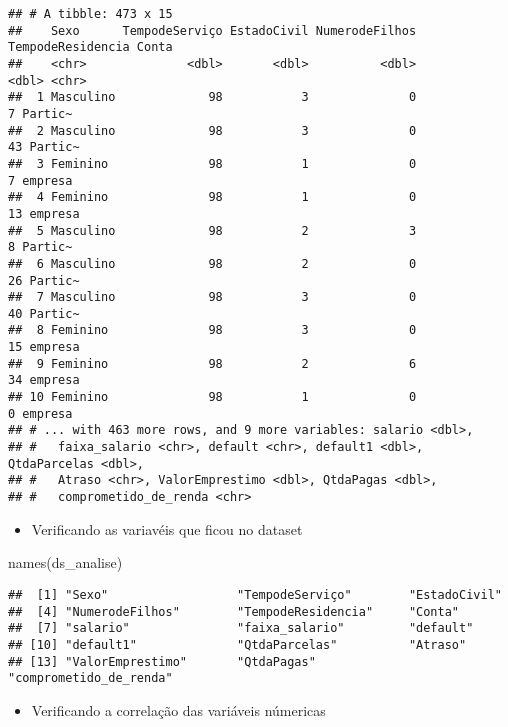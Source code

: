 \documentclass[
]{article}
\newenvironment{Shaded}{\begin{snugshade}}{\end{snugshade}}
\newcommand{\FunctionTok}[1]{\textcolor[rgb]{0.00,0.00,0.00}{#1}}
\newcommand{\NormalTok}[1]{#1}
\providecommand{\tightlist}{%
  \setlength{\itemsep}{0pt}\setlength{\parskip}{0pt}}
\begin{document}
\begin{verbatim}
## # A tibble: 473 x 15
##    Sexo      TempodeServiço EstadoCivil NumerodeFilhos TempodeResidencia Conta  
##    <chr>              <dbl>       <dbl>          <dbl>             <dbl> <chr>  
##  1 Masculino             98           3              0                 7 Partic~
##  2 Masculino             98           3              0                43 Partic~
##  3 Feminino              98           1              0                 7 empresa
##  4 Feminino              98           1              0                13 empresa
##  5 Masculino             98           2              3                 8 Partic~
##  6 Masculino             98           2              0                26 Partic~
##  7 Masculino             98           3              0                40 Partic~
##  8 Feminino              98           3              0                15 empresa
##  9 Feminino              98           2              6                34 empresa
## 10 Feminino              98           1              0                 0 empresa
## # ... with 463 more rows, and 9 more variables: salario <dbl>,
## #   faixa_salario <chr>, default <chr>, default1 <dbl>, QtdaParcelas <dbl>,
## #   Atraso <chr>, ValorEmprestimo <dbl>, QtdaPagas <dbl>,
## #   comprometido_de_renda <chr>
\end{verbatim}

\begin{itemize}
\tightlist
\item
  Verificando as variavéis que ficou no dataset
\end{itemize}

\begin{Shaded}
\begin{Highlighting}[]
\FunctionTok{names}\NormalTok{(ds\_analise)}
\end{Highlighting}
\end{Shaded}

\begin{verbatim}
##  [1] "Sexo"                  "TempodeServiço"        "EstadoCivil"          
##  [4] "NumerodeFilhos"        "TempodeResidencia"     "Conta"                
##  [7] "salario"               "faixa_salario"         "default"              
## [10] "default1"              "QtdaParcelas"          "Atraso"               
## [13] "ValorEmprestimo"       "QtdaPagas"             "comprometido_de_renda"
\end{verbatim}

\begin{itemize}
\tightlist
\item
  Verificando a correlação das variáveis númericas
\end{itemize}
\end{document}
